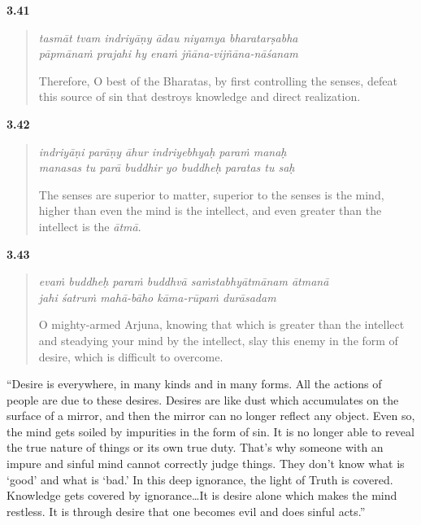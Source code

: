 \par\noindent\textbf{3.41}\par
\begin{verse}
\textit{tasmāt tvam indriyāṇy ādau niyamya bharatarṣabha} \\
\textit{pāpmānaṁ prajahi hy enaṁ jñāna-vijñāna-nāśanam}

\noindent Therefore, O best of the Bharatas, by first controlling the senses, defeat this source of sin that destroys knowledge and direct realization.
\end{verse}
\par



\par\noindent\textbf{3.42}\par
\begin{verse}
\textit{indriyāṇi parāṇy āhur indriyebhyaḥ paraṁ manaḥ} \\
\textit{manasas tu parā buddhir yo buddheḥ paratas tu saḥ}

\noindent The senses are superior to matter, superior to the senses is the mind, higher than even the mind is the intellect, and even greater than the intellect is the \textit{ātmā}.
\end{verse}
\par



\par\noindent\textbf{3.43}\par
\begin{verse}
\textit{evaṁ buddheḥ paraṁ buddhvā saṁstabhyātmānam ātmanā} \\
\textit{jahi śatruṁ mahā-bāho kāma-rūpaṁ durāsadam}

\noindent O mighty-armed Arjuna, knowing that which is greater than the intellect and steadying your mind by the intellect, slay this enemy in the form of desire, which is difficult to overcome.
\end{verse}
\par


\enquote{Desire is everywhere, in many kinds and in many forms. All the actions of people are due to these desires. Desires are like dust which accumulates on the surface of a mirror, and then the mirror can no longer reflect any object. Even so, the mind gets soiled by impurities in the form of sin. It is no longer able to reveal the true nature of things or its own true duty. That’s why someone with an impure and sinful mind cannot correctly judge things. They don’t know what is \enquote{good} and what is \enquote{bad.} In this deep ignorance, the light of Truth is covered. Knowledge gets covered by ignorance\ldots It is desire alone which makes the mind restless. It is through desire that one becomes evil and does sinful acts.}

